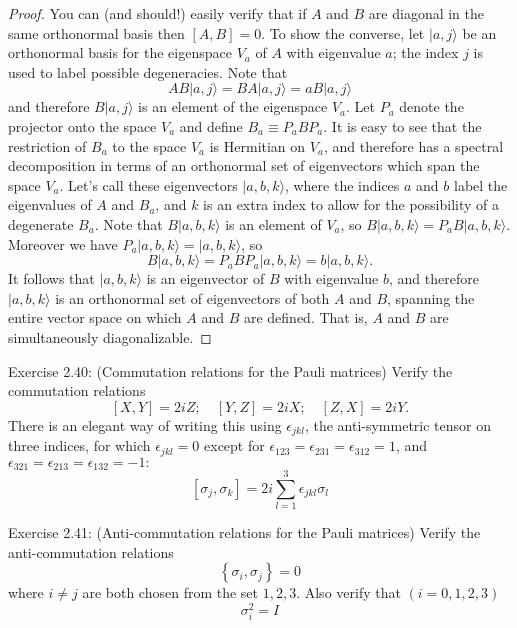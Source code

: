 \begin{proof}
    You can (and should!) easily verify that if $A$ and $B$ are diagonal in the same orthonormal basis then $[A, B]=0$. To show the converse, let $|a, j\rangle$ be an orthonormal basis for the eigenspace $V_{a}$ of $A$ with eigenvalue $a$; the index $j$ is used to label possible degeneracies. Note that
$$
A B|a, j\rangle=B A|a, j\rangle=a B|a, j\rangle
$$
and therefore $B|a, j\rangle$ is an element of the eigenspace $V_{a}$. Let $P_{a}$ denote the projector onto the space $V_{a}$ and define $B_{a} \equiv P_{a} B P_{a}$. It is easy to see that the restriction of $B_{a}$ to the space $V_{a}$ is Hermitian on $V_{a}$, and therefore has a spectral decomposition in terms of an orthonormal set of eigenvectors which span the space $V_{a}$. Let's call these eigenvectors $|a, b, k\rangle$, where the indices $a$ and $b$ label the eigenvalues of $A$ and $B_{a}$, and $k$ is an extra index to allow for the possibility of a degenerate $B_{a}$. Note that $B|a, b, k\rangle$ is an element of $V_{a}$, so $B|a, b, k\rangle=P_{a} B|a, b, k\rangle$. Moreover we have $P_{a}|a, b, k\rangle=|a, b, k\rangle$, so
$$
B|a, b, k\rangle=P_{a} B P_{a}|a, b, k\rangle=b|a, b, k\rangle .
$$
It follows that $|a, b, k\rangle$ is an eigenvector of $B$ with eigenvalue $b$, and therefore $|a, b, k\rangle$ is an orthonormal set of eigenvectors of both $A$ and $B$, spanning the entire vector space on which $A$ and $B$ are defined. That is, $A$ and $B$ are simultaneously diagonalizable.
\end{proof}

\begin{exercise}
Exercise 2.40: (Commutation relations for the Pauli matrices) Verify the commutation relations
$$
[X, Y]=2 i Z ; \quad[Y, Z]=2 i X ; \quad[Z, X]=2 i Y .
$$
There is an elegant way of writing this using $\epsilon_{j k l}$, the anti-symmetric tensor on three indices, for which $\epsilon_{j k l}=0$ except for $\epsilon_{123}=\epsilon_{231}=\epsilon_{312}=1$, and $\epsilon_{321}=\epsilon_{213}=\epsilon_{132}=-1:$
$$
\left[\sigma_{j}, \sigma_{k}\right]=2 i \sum_{l=1}^{3} \epsilon_{j k l} \sigma_{l}
$$
\end{exercise}

\begin{exercise}
Exercise 2.41: (Anti-commutation relations for the Pauli matrices) Verify the anti-commutation relations
$$
\left\{\sigma_{i}, \sigma_{j}\right\}=0
$$
where $i \neq j$ are both chosen from the set $1,2,3$. Also verify that $(i=0,1,2,3)$
$$
\sigma_{i}^{2}=I
$$
\end{exercise}

